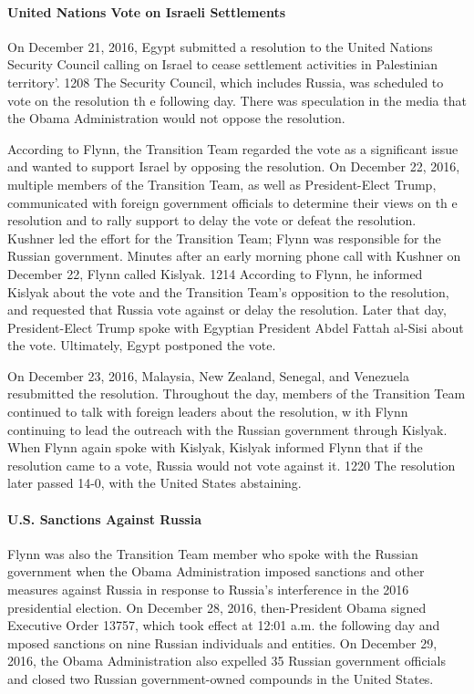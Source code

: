 \paragraph{United Nations Vote on Israeli Settlements}

On December 21, 2016, Egypt submitted a resolution to the United Nations Security Council calling on Israel to cease settlement activities in Palestinian territory'. 1208 The Security Council, which includes Russia, was scheduled to vote on the resolution th e following day.%
There was speculation in the media that the Obama Administration would not oppose the resolution.%

According to Flynn, the Transition Team regarded the vote as a significant issue and wanted to support Israel by opposing the resolution.%
On December 22, 2016, multiple members of the Transition Team, as well as President-Elect Trump, communicated with foreign government officials to determine their views on th e resolution and to rally support to delay the vote or defeat the resolution.%
Kushner led the effort for the Transition Team; Flynn was responsible for the Russian government.%
Minutes after an early morning phone call with Kushner on December 22, Flynn called Kislyak. 1214 According to Flynn, he informed Kislyak about the vote and the Transition Team's opposition to the resolution, and requested that Russia vote against or delay the resolution.%
Later that day, President-Elect Trump spoke with Egyptian President Abdel Fattah al-Sisi about the vote.%
Ultimately, Egypt postponed the vote.%

On December 23, 2016, Malaysia, New Zealand, Senegal, and Venezuela resubmitted the resolution.%
Throughout the day, members of the Transition Team continued to talk with foreign leaders about the resolution, w ith Flynn continuing to lead the outreach with the Russian government through Kislyak.%
When Flynn again spoke with Kislyak, Kislyak informed Flynn that if the resolution came to a vote, Russia would not vote against it. 1220 The resolution later passed 14-0, with the United States abstaining.%

\paragraph{U.S. Sanctions Against Russia}

Flynn was also the Transition Team member who spoke with the Russian government when the Obama Administration imposed sanctions and other measures against Russia in response to Russia's interference in the 2016 presidential election. On December 28, 2016, then-President Obama signed Executive Order 13757, which took effect at 12:01 a.m. the following day and mposed sanctions on nine Russian individuals and entities.%
On December 29, 2016, the Obama Administration also expelled 35 Russian government officials and closed two Russian government-owned compounds in the United States.%

